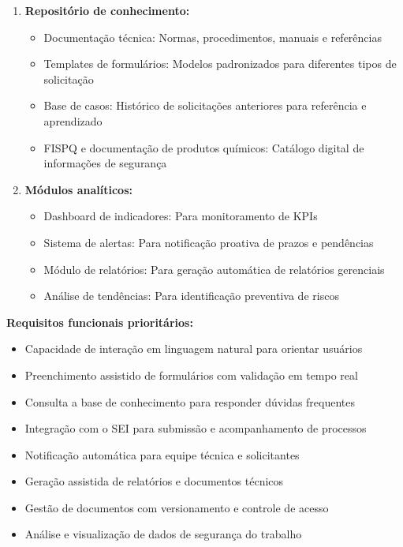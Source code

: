 \documentclass[12pt,a4paper]{article}
\begin{document}
\begin{enumerate}
    \item \textbf{Repositório de conhecimento:}
    \begin{itemize}
        \item Documentação técnica: Normas, procedimentos, manuais e referências
        \item Templates de formulários: Modelos padronizados para diferentes tipos de solicitação
        \item Base de casos: Histórico de solicitações anteriores para referência e aprendizado
        \item FISPQ e documentação de produtos químicos: Catálogo digital de informações de segurança
    \end{itemize}
    
    \item \textbf{Módulos analíticos:}
    \begin{itemize}
        \item Dashboard de indicadores: Para monitoramento de KPIs
        \item Sistema de alertas: Para notificação proativa de prazos e pendências
        \item Módulo de relatórios: Para geração automática de relatórios gerenciais
        \item Análise de tendências: Para identificação preventiva de riscos
    \end{itemize}
\end{enumerate}

\textbf{Requisitos funcionais prioritários:}

\begin{itemize}
    \item Capacidade de interação em linguagem natural para orientar usuários
    \item Preenchimento assistido de formulários com validação em tempo real
    \item Consulta a base de conhecimento para responder dúvidas frequentes
    \item Integração com o SEI para submissão e acompanhamento de processos
    \item Notificação automática para equipe técnica e solicitantes
    \item Geração assistida de relatórios e documentos técnicos
    \item Gestão de documentos com versionamento e controle de acesso
    \item Análise e visualização de dados de segurança do trabalho
\end{itemize}
\end{document}
